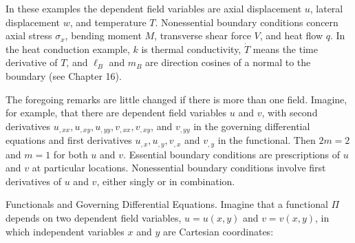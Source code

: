 \documentclass[10pt]{article}
\begin{document}
\begin{center}
\noindent{}
\end{center}

In these examples the dependent field variables are axial displacement $u$, lateral displacement $w$, and temperature $T$. Nonessential boundary conditions concern axial stress $\sigma_{x}$, bending moment $M$, transverse shear force $V$, and heat flow $q$. In the heat conduction example, $k$ is thermal conductivity, $\dot{T}$ means the time derivative of $T$, and $\ell_{B}$ and $m_{B}$ are direction cosines of a normal to the boundary (see Chapter 16).

The foregoing remarks are little changed if there is more than one field. Imagine, for example, that there are dependent field variables $u$ and $v$, with second derivatives $u_{,x x}, u_{,xy}, u_{,yy}, v_{,xx}, v_{,xy}$, and $v_{,yy}$ in the governing differential equations and first derivatives $u_{,x}, u_{,y}, v_{,x}$ and $v_{,y}$ in the functional. Then $2m=2$ and $m=1$ for both $u$ and $v$. Essential boundary conditions are prescriptions of $u$ and $v$ at particular locations. Nonessential boundary conditions involve first derivatives of $u$ and $v$, either singly or in combination.

Functionals and Governing Differential Equations. Imagine that a functional $\Pi$ depends on two dependent field variables, $u=u(x, y)$ and $v=v(x, y)$, in which independent variables $x$ and $y$ are Cartesian coordinates:
\end{document}
